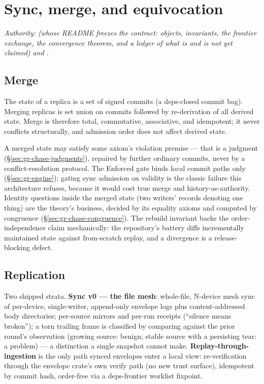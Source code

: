 \section{Sync, merge, and equivocation}
\label{sec:gr-sync}

\emph{Authority:  (whose README freezes the
contract: objects, invariants, the frontier exchange, the convergence
theorem, and a ledger of what is and is not yet claimed) and
.}

\subsection{Merge}
\label{sec:gr-sync-merge}

\begin{definition}[merge]
\label{def:gr-merge}
The state of a replica is a set of signed commits (a deps-closed
commit bag). Merging replicas is set union on commits followed by
re-derivation of all derived state. Merge is therefore total,
commutative, associative, and idempotent; it never conflicts
structurally, and admission order does not affect derived state.
\end{definition}

\noindent A merged state may satisfy some axiom's violation premise —
that is a judgment (\S\ref{sec:gr-chase-judgments}), repaired by
further ordinary commits, never by a conflict-resolution protocol.
The Enforced gate binds local commit paths only
(\S\ref{sec:gr-engine}); gating sync admission on validity is the
classic failure this architecture refuses, because it would cost true
merge and history-as-authority. Identity questions inside the merged
state (two writers' records denoting one thing) are the theory's
business, decided by its equality axioms and computed by congruence
(\S\ref{sec:gr-chase-congruence}). The rebuild invariant backs the
order-independence claim mechanically: the repository's battery diffs
incrementally maintained state against from-scratch replay, and a
divergence is a release-blocking defect.

\subsection{Replication}
\label{sec:gr-sync-replication}

Two shipped strata. \textbf{Sync v0 — the file mesh}: whole-file,
N-device mesh sync of per-device, single-writer, append-only envelope
logs plus content-addressed body directories; per-source mirrors and
per-run receipts (``silence means broken''); a torn trailing frame is
classified by comparing against the prior round's observation
(growing source: benign; stable source with a persisting tear: a
problem) — a distinction a single snapshot cannot make.
\textbf{Replay-through-ingestion} is the only path synced envelopes
enter a local view: re-verification through the envelope crate's own
verify path (no new trust surface), idempotent by commit hash,
order-free via a deps-frontier worklist fixpoint.

